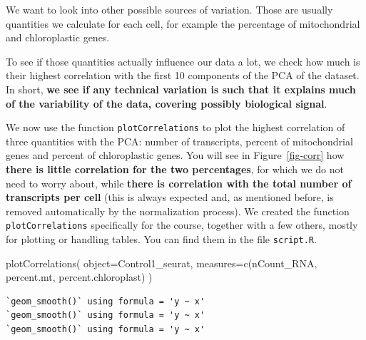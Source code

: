 \documentclass[
  letterpaper,
  DIV=11,
  numbers=noendperiod]{scrartcl}
\newenvironment{Shaded}{}{}
\newcommand{\AttributeTok}[1]{\textcolor[rgb]{0.49,0.56,0.16}{#1}}
\newcommand{\FunctionTok}[1]{\textcolor[rgb]{0.02,0.16,0.49}{#1}}
\newcommand{\NormalTok}[1]{#1}
\newcommand{\StringTok}[1]{\textcolor[rgb]{0.25,0.44,0.63}{#1}}
\begin{document}
We want to look into other possible sources of variation. Those are
usually quantities we calculate for each cell, for example the
percentage of mitochondrial and chloroplastic genes.

To see if those quantities actually influence our data a lot, we check
how much is their highest correlation with the first 10 components of
the PCA of the dataset. In short, \textbf{we see if any technical
variation is such that it explains much of the variability of the data,
covering possibly biological signal}.

We now use the function \texttt{plotCorrelations} to plot the highest
correlation of three quantities with the PCA: number of transcripts,
percent of mitochondrial genes and percent of chloroplastic genes. You
will see in Figure~\ref{fig-corr} how \textbf{there is little
correlation for the two percentages}, for which we do not need to worry
about, while \textbf{there is correlation with the total number of
transcripts per cell} (this is always expected and, as mentioned before,
is removed automatically by the normalization process). We created the
function \texttt{plotCorrelations} specifically for the course, together
with a few others, mostly for plotting or handling tables. You can find
them in the file \texttt{script.R}.

\begin{Shaded}
\begin{Highlighting}[]
\FunctionTok{plotCorrelations}\NormalTok{( }\AttributeTok{object=}\NormalTok{Control1\_seurat, }\AttributeTok{measures=}\FunctionTok{c}\NormalTok{(}\StringTok{\textquotesingle{}nCount\_RNA\textquotesingle{}}\NormalTok{, }\StringTok{\textquotesingle{}percent.mt\textquotesingle{}}\NormalTok{, }\StringTok{\textquotesingle{}percent.chloroplast\textquotesingle{}}\NormalTok{) )}
\end{Highlighting}
\end{Shaded}

\begin{verbatim}
`geom_smooth()` using formula = 'y ~ x'
`geom_smooth()` using formula = 'y ~ x'
`geom_smooth()` using formula = 'y ~ x'
\end{verbatim}
\end{document}
